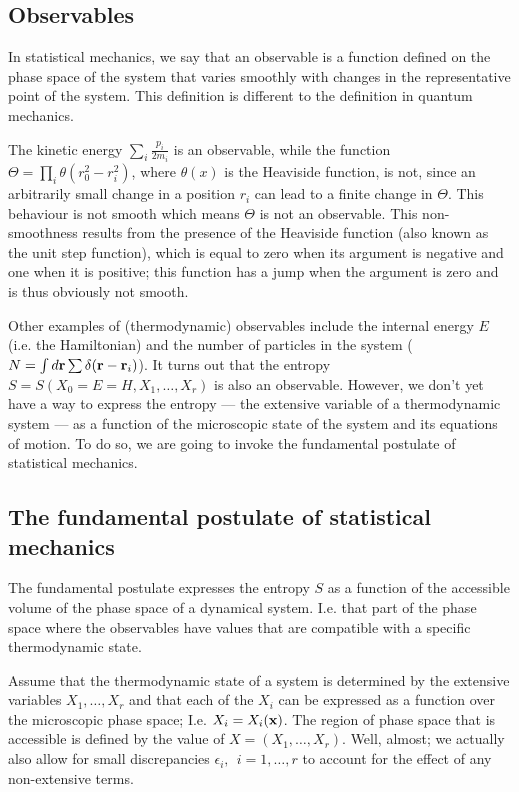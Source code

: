 \subsection{Observables}
In statistical mechanics, we say that an observable is a function defined on the phase space of the system that varies smoothly with changes in the representative point of the system. This definition is different to the definition in quantum mechanics.

The kinetic energy $\sum_i \frac{p_i}{2m_i}$ is an observable, while the function $\Theta = \prod_i \theta(r_0^2-r_i^2)$, where $\theta(x)$ is the Heaviside function, is not, since an arbitrarily small change in a position $r_i$ can lead to a finite change in $\Theta$. This behaviour is not smooth which means $\Theta$ is not an observable. This non-smoothness results from the presence of the Heaviside function (also known as the unit step function), which is equal to zero when its argument is negative and one when it is positive; this function has a jump when the argument is zero and is thus obviously not smooth.

Other examples of (thermodynamic) observables include the internal energy $E$ (i.e. the Hamiltonian) and the number of particles in the system ($N = \int d{\bf r}\sum\delta({\bf r}-{\bf r}_i)$).
It turns out that the entropy $S=S(X_0=E=H,X_1,\ldots,X_r)$ is also an observable. However, we don't yet have a way to express the entropy --- the extensive variable of a thermodynamic system --- as a function of the microscopic state of the system and its equations of motion. To do so, we are going to invoke the fundamental postulate of statistical mechanics.

\subsection{The fundamental postulate of statistical mechanics}
The fundamental postulate expresses the entropy $S$ as a function of the accessible volume of the phase space of a dynamical system. I.e. that part of the phase space where the observables have values that are compatible with a specific thermodynamic state.

Assume that the thermodynamic state of a system is determined by the extensive variables $X_1,\ldots,X_r$ and that each of the $X_i$ can be expressed as a function over the microscopic phase space; I.e. $X_i = X_i({\bf x})$.
The region of phase space that is accessible is defined by the value of $X = (X_1,\ldots,X_r)$. Well, almost; we actually also allow for small discrepancies $\epsilon_i,~~i=1,\ldots,r$ to account for the effect of any non-extensive terms.

